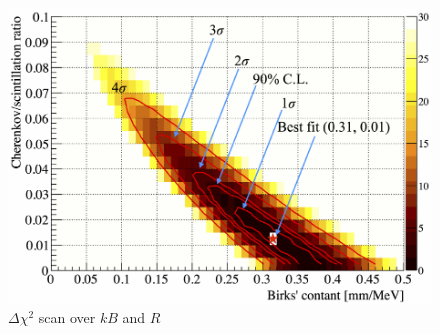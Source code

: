 \begin{figure}[htb]
	\centering
	\includegraphics[scale=0.35]{kb_r_chisquare.png}
	\caption{$\Delta\chi^2$ scan over $kB$ and $R$}
	\label{fig:kb_r_chisquare}
\end{figure}

